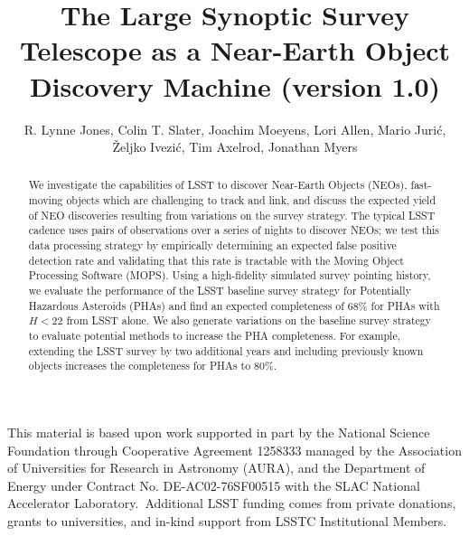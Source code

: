 \documentclass[12pt,preprint]{aastex}
\begin{document}
\title{The Large Synoptic Survey Telescope as a Near-Earth Object Discovery Machine (version 1.0)}

\author{R. Lynne Jones,
Colin T. Slater,
Joachim Moeyens,
Lori Allen,
Mario Juri\'{c},
\v{Z}eljko Ivezi\'{c},
Tim Axelrod,
Jonathan Myers
}

\begin{abstract}
We investigate the capabilities of LSST to discover Near-Earth Objects (NEOs), fast-moving objects
which are challenging to track and link, and discuss the expected yield of NEO discoveries
resulting from variations on the survey strategy. The typical LSST cadence uses pairs of observations
over a series of nights to discover NEOs; we test this data processing strategy by empirically determining 
an expected false positive detection rate and validating that this rate is tractable with the Moving Object
Processing Software (MOPS).  Using a high-fidelity simulated survey pointing history, we evaluate the 
performance of the LSST baseline survey strategy for Potentially Hazardous Asteroids (PHAs) and 
find an expected completeness of 68\% for PHAs with $H<22$ from LSST alone. We also generate variations
on the baseline survey strategy to evaluate potential methods to increase the PHA completeness. For example,
extending the LSST survey by two additional years and including previously known objects increases the 
completeness for PHAs to 80\%. 
\end{abstract}














\acknowledgements
This material is based upon work supported in part by the National Science
Foundation through Cooperative Agreement 1258333 managed by the Association of
Universities for Research in Astronomy (AURA), and the Department of Energy
under Contract No. DE-AC02-76SF00515 with the SLAC National Accelerator
Laboratory. Additional LSST funding comes from private donations, grants to
universities, and in-kind support from LSSTC Institutional Members.

\appendix


% 


\end{document}
